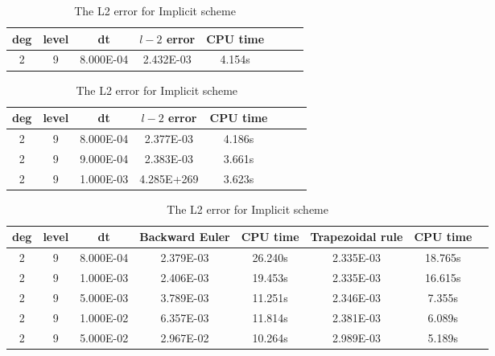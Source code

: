 \documentclass[a4paper]{article}
\begin{document}
\begin{table}[htbp]
\caption{\label{tab:test}1D: The L2 error for Explicit 3rd Runge Kutta with time period=1.5}
\centering
\vspace{5pt}
\begin{tabular}{cccccccc}
\toprule
deg & level&dt&$l-2$ error &CPU time \\
\midrule
2&9&8.000E-04&2.432E-03&4.154s\\
\bottomrule
\end{tabular}
\caption{\label{tab:test}The L2 error for Semi-Implicit Backward Euler}
\centering
\vspace{5pt}

\begin{tabular}{cccccccc}
\toprule
deg & level&dt&$l-2$ error &CPU time \\
\midrule
2&9&8.000E-04&2.377E-03&4.186s\\
2&9&9.000E-04&2.383E-03&3.661s\\
2&9&1.000E-03&4.285E+269&3.623s\\
\bottomrule
\end{tabular}


\caption{\label{tab:test}The L2 error for Implicit scheme}
\centering
\vspace{5pt}

\begin{tabular}{cccccccc}
\toprule
deg & level&dt&Backward Euler &CPU time &Trapezoidal rule&CPU time\\
\midrule
2&9&8.000E-04&2.379E-03&26.240s&2.335E-03&18.765s\\
2&9&1.000E-03&2.406E-03&19.453s&2.335E-03&16.615s\\
2&9&5.000E-03&3.789E-03&11.251s&2.346E-03&7.355s\\
2&9&1.000E-02&6.357E-03&11.814s&2.381E-03&6.089s\\
2&9&5.000E-02&2.967E-02&10.264s&2.989E-03&5.189s\\
\bottomrule
\end{tabular}


\end{table}
\end{document}
